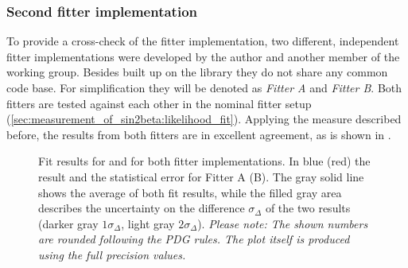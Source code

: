 \subsubsection{Second fitter implementation}
\label{sec:measurement_of_sin2beta:systematics:cross_checks:second_fitter}
%
To provide a cross-check of the fitter implementation, two different,
independent fitter implementations were developed by the author and another
member of the working group. Besides built up on the \RooFit library they do not
share any common code base. For simplification they will be denoted as
\emph{Fitter A} and \emph{Fitter B}. Both fitters are tested against each other
in the nominal fitter setup (\cref{sec:measurement_of_sin2beta:likelihood_fit}).
Applying the measure described before, the results from both fitters are in
excellent agreement, as is shown in
.
%
\begin{figure}
\centering


\caption{
Fit results for \SJpsiKS and \CJpsiKS for both fitter implementations.
In blue (red) the result and the statistical error for Fitter A (B). The
gray solid line shows the average of both fit results, while the filled gray
area describes the uncertainty on the difference $\sigma_\Delta$ of the two
results (darker gray $1\sigma_\Delta$, light gray $2\sigma_\Delta$).
\textit{Please note: The shown numbers are rounded following the PDG rules. The
plot itself is produced using the full precision values.} }
\label{fig:measurement_of_sin2beta:systematics:cross_checks:second_fitter}
\end{figure}

